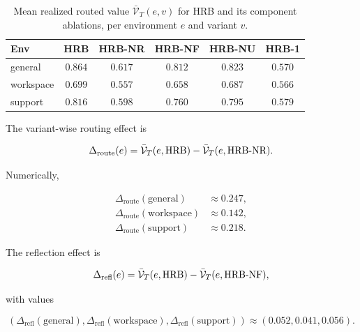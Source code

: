\documentclass{article} %
\begin{document}
\begin{table}[h]
\centering
\small
\begin{tabular}{lccccc}
\toprule
Env & HRB & HRB-NR & HRB-NF & HRB-NU & HRB-1 \\
\midrule
general    & $0.864$ & $0.617$ & $0.812$ & $0.823$ & $0.570$ \\
workspace  & $0.699$ & $0.557$ & $0.658$ & $0.687$ & $0.566$ \\
support    & $0.816$ & $0.598$ & $0.760$ & $0.795$ & $0.579$ \\
\bottomrule
\end{tabular}
\caption{Mean realized routed value $\bar{\mathcal{V}}_T(e,v)$ for HRB and its component ablations, per environment $e$ and variant $v$.}
\label{tab:app-mean-reward-sweeps}
\end{table}

The variant-wise routing effect is

\begin{equation}
\label{eq:app-routing-effect}
\Delta_{\mathrm{route}}(e) = \bar{\mathcal{V}}_T(e,\mathrm{HRB}) - \bar{\mathcal{V}}_T(e,\textnormal{HRB-NR}).
\end{equation}

Numerically,

\begin{equation}
\label{eq:app-routing-numbers}
\begin{aligned}
\Delta_{\mathrm{route}}(\mathrm{general}) &\approx 0.247,\\
\Delta_{\mathrm{route}}(\mathrm{workspace}) &\approx 0.142,\\
\Delta_{\mathrm{route}}(\mathrm{support}) &\approx 0.218.
\end{aligned}
\end{equation}

The reflection effect is

\begin{equation}
\label{eq:app-reflection-effect}
\Delta_{\mathrm{refl}}(e) = \bar{\mathcal{V}}_T(e,\mathrm{HRB}) - \bar{\mathcal{V}}_T(e,\textnormal{HRB-NF}),
\end{equation}

with values

\begin{equation}
\label{eq:app-reflection-numbers}
(\Delta_{\mathrm{refl}}(\mathrm{general}),\Delta_{\mathrm{refl}}(\mathrm{workspace}),\Delta_{\mathrm{refl}}(\mathrm{support}))
\approx (0.052, 0.041, 0.056).
\end{equation}
\end{document}
